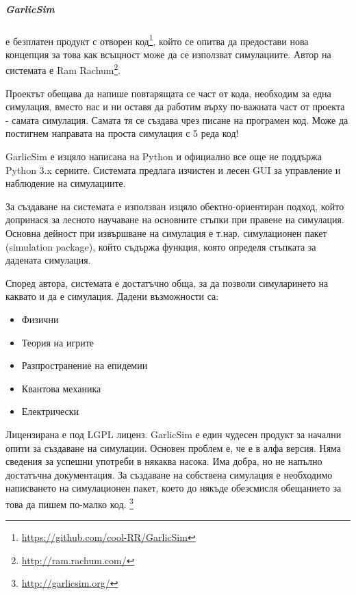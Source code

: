 		\subparagraph{GarlicSim} е безплатен продукт с отворен код\footnote{\url{https://github.com/cool-RR/GarlicSim}}, 
			който се опитва да предостави нова концепция за това как всъщност може да се използват симулациите.
			Автор на системата е Ram Rachum\footnote{\url{http://ram.rachum.com/}}.														
			
			Проектът обещава да напише повтарящата се част от кода, необходим за една симулация, вместо нас и ни
			оставя да работим върху по-важната част от проекта - самата симулация. Самата тя се създава чрез 
			писане на програмен код. Може да постигнем направата на проста симулация с 5 реда код!   			
							
			GarlicSim е изцяло написана на Python и официално все още не поддържа Python 3.x сериите. 
			Системата предлага изчистен и лесен GUI за управление и наблюдение на симулациите. 			
		
			За създаване на системата е използван изцяло обектно-ориентиран подход, който допринася за лесното
			научаване на основните стъпки при правене на симулация. Основна дейност при извършване на симулация
			е т.нар. симулационен пакет (simulation package), който съдържа функция, която определя стъпката за
			дадената симулация.
		
			Според автора, системата е достатъчно обща, за да позволи симуларинето на каквато и да е симулация.
			Дадени възможности са:

				\begin{itemize}
				\item Физични
				\item Теория на игрите
				\item Разпространение на епидемии
				\item Квантова механика
				\item Електрически
			\end{itemize}								
			
			Лицензирана е под \ac{LGPL} лиценз. GarlicSim е един чудесен продукт за начални опити за създаване на симулации. 
			Основен проблем е, че е в алфа версия. Няма сведения за успешни употреби в някаква насока.
			Има добра, но не напълно достатъчна документация. За създаване на собствена симулация е необходимо
			написването на симулационен пакет, което до някъде обезсмисля обещанието за това да пишем по-малко код.
			\footnote{\url{http://garlicsim.org/}}